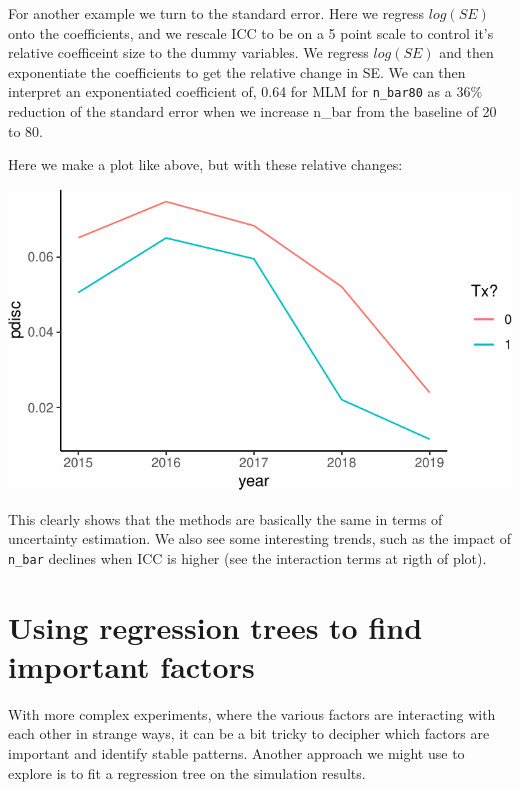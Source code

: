 \documentclass[
]{book}
\begin{document}
For another example we turn to the standard error.
Here we regress \(log(SE)\) onto the coefficients, and we rescale ICC to be on a 5 point scale to control it's relative coefficeint size to the dummy variables.
We regress \(log(SE)\) and then exponentiate the coefficients to get the relative change in SE.
We can then interpret an exponentiated coefficient of, 0.64 for MLM for \texttt{n\_bar80} as a 36\% reduction of the standard error when we increase n\_bar from the baseline of 20 to 80.

Here we make a plot like above, but with these relative changes:

\begin{center}\includegraphics[width=0.75\linewidth]{Designing-Simulations-in-R_files/figure-latex/unnamed-chunk-257-1} \end{center}

This clearly shows that the methods are basically the same in terms of uncertainty estimation.
We also see some interesting trends, such as the impact of \texttt{n\_bar} declines when ICC is higher (see the interaction terms at rigth of plot).

\section{Using regression trees to find important factors}\label{using-regression-trees-to-find-important-factors}

With more complex experiments, where the various factors are interacting with each other in strange ways, it can be a bit tricky to decipher which factors are important and identify stable patterns.
Another approach we might use to explore is to fit a regression tree on the simulation results.
\end{document}
